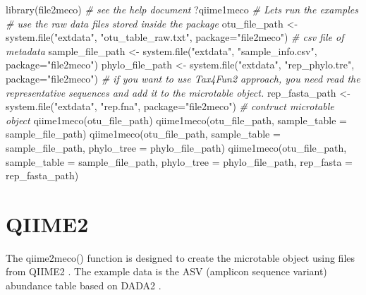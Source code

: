 \documentclass[
]{book}
\newenvironment{Shaded}{\begin{snugshade}}{\end{snugshade}}
\newcommand{\AttributeTok}[1]{\textcolor[rgb]{0.77,0.63,0.00}{#1}}
\newcommand{\CommentTok}[1]{\textcolor[rgb]{0.56,0.35,0.01}{\textit{#1}}}
\newcommand{\FunctionTok}[1]{\textcolor[rgb]{0.00,0.00,0.00}{#1}}
\newcommand{\NormalTok}[1]{#1}
\newcommand{\OtherTok}[1]{\textcolor[rgb]{0.56,0.35,0.01}{#1}}
\newcommand{\StringTok}[1]{\textcolor[rgb]{0.31,0.60,0.02}{#1}}
\begin{document}
\begin{Shaded}
\begin{Highlighting}[]
\FunctionTok{library}\NormalTok{(file2meco)}
\CommentTok{\# see the help document}
\NormalTok{?qiime1meco}
\CommentTok{\# Let\textquotesingle{}s run the examples}
\CommentTok{\# use the raw data files stored inside the package}
\NormalTok{otu\_file\_path }\OtherTok{\textless{}{-}} \FunctionTok{system.file}\NormalTok{(}\StringTok{"extdata"}\NormalTok{, }\StringTok{"otu\_table\_raw.txt"}\NormalTok{, }\AttributeTok{package=}\StringTok{"file2meco"}\NormalTok{)}
\CommentTok{\# csv file of metadata}
\NormalTok{sample\_file\_path }\OtherTok{\textless{}{-}} \FunctionTok{system.file}\NormalTok{(}\StringTok{"extdata"}\NormalTok{, }\StringTok{"sample\_info.csv"}\NormalTok{, }\AttributeTok{package=}\StringTok{"file2meco"}\NormalTok{)}
\NormalTok{phylo\_file\_path }\OtherTok{\textless{}{-}} \FunctionTok{system.file}\NormalTok{(}\StringTok{"extdata"}\NormalTok{, }\StringTok{"rep\_phylo.tre"}\NormalTok{, }\AttributeTok{package=}\StringTok{"file2meco"}\NormalTok{)}
\CommentTok{\# if you want to use Tax4Fun2 approach, you need read the representative sequences and add it to the microtable object.}
\NormalTok{rep\_fasta\_path }\OtherTok{\textless{}{-}} \FunctionTok{system.file}\NormalTok{(}\StringTok{"extdata"}\NormalTok{, }\StringTok{"rep.fna"}\NormalTok{, }\AttributeTok{package=}\StringTok{"file2meco"}\NormalTok{)}
\CommentTok{\# contruct microtable object}
\FunctionTok{qiime1meco}\NormalTok{(otu\_file\_path)}
\FunctionTok{qiime1meco}\NormalTok{(otu\_file\_path, }\AttributeTok{sample\_table =}\NormalTok{ sample\_file\_path)}
\FunctionTok{qiime1meco}\NormalTok{(otu\_file\_path, }\AttributeTok{sample\_table =}\NormalTok{ sample\_file\_path, }\AttributeTok{phylo\_tree =}\NormalTok{ phylo\_file\_path)}
\FunctionTok{qiime1meco}\NormalTok{(otu\_file\_path, }\AttributeTok{sample\_table =}\NormalTok{ sample\_file\_path, }\AttributeTok{phylo\_tree =}\NormalTok{ phylo\_file\_path, }\AttributeTok{rep\_fasta =}\NormalTok{ rep\_fasta\_path)}
\end{Highlighting}
\end{Shaded}

\hypertarget{qiime2}{%
\section{QIIME2}\label{qiime2}}

The qiime2meco() function is designed to create the microtable object using files from QIIME2 \citep{Bolyen_Reproducible_2019}.
The example data is the ASV (amplicon sequence variant) abundance table based on DADA2 \citep{Callahan_DADA2_2016}.
\end{document}
